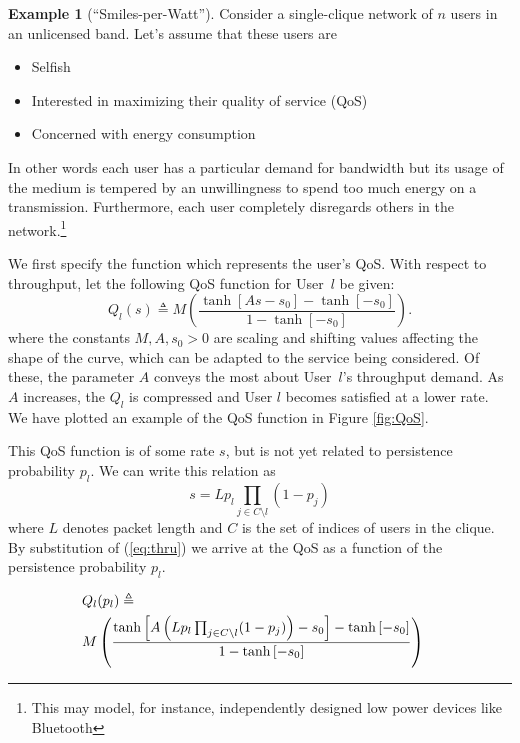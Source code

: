 \documentclass[11pt]{IEEEtran}
\theoremstyle{definition}
\newtheorem{example}{Example}
\begin{document}
\begin{example}[``Smiles-per-Watt'']
Consider a single-clique network of $n$ users in an unlicensed band. Let's assume that these users are
\begin{itemize}
	\item Selfish
	\item Interested in maximizing their quality of service (QoS)
	\item Concerned with energy consumption 
\end{itemize}
In other words each user has a particular demand for bandwidth but its usage of the medium is tempered by an unwillingness to spend too much energy on a transmission. Furthermore, each user completely disregards others in the network.\footnote{This may model, for instance, independently designed low power devices like Bluetooth}

We first specify the function which represents the user's QoS.  With respect to throughput, let the following QoS function for User~$l$ be given:
\begin{equation}
  Q_l(s) \triangleq M \left(\frac{\tanh\left[As-s_0\right] - \tanh\left[-s_0\right]}{1-\tanh\left[-s_0\right]}\right).
  \label{eq:qos1}
\end{equation}
where the constants $M, A, s_0 > 0$ are scaling and shifting values affecting the shape of the curve, which can be adapted to the service being considered. Of these, the parameter $A$ conveys the most about User~$l$'s throughput demand. As $A$ increases, the $Q_l$ is compressed and User $l$ becomes satisfied at a lower rate. We have plotted an example of the QoS function in Figure \ref{fig:QoS}.

This QoS function is of some rate $s$, but is not yet related to persistence probability $p_l$.  We can write this relation as
\begin{equation}
  s = L p_l \prod_{j \in C\setminus l} (1-p_j)
  \label{eq:thru}
\end{equation}
where $L$ denotes packet length and $C$ is the set of indices of users in the clique. By substitution of (\ref{eq:thru}) we arrive at the QoS as a function of the persistence probability $p_l$.

\begin{eqnarray}
  \lefteqn{Q_l(p_l) \triangleq}\nonumber\\
  & M \left(\frac{\tanh\left[A\left(L p_l \prod_{j \in C\setminus l} (1-p_j)\right)-s_0\right] - \tanh\left[-s_0\right]}{1-\tanh\left[-s_0\right]}\right)
\end{eqnarray}


\end{example}
\end{document}
